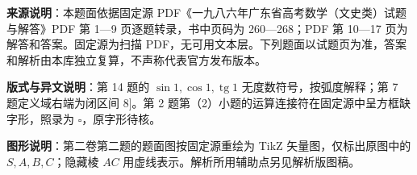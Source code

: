 

\begin{gktip}
\textbf{来源说明}：本题面依据固定源 PDF《一九八六年广东省高考数学（文史类）试题与解答》PDF 第 1—9 页逐题转录，书中页码为 260—268；PDF 第 10—17 页为解答和答案。固定源为扫描 PDF，无可用文本层。下列题面以试题页为准，答案和解析由本库独立复算，不声称代表官方发布版本。

\textbf{版式与异文说明}：第 14 题的 $\sin1,\cos1,\operatorname{tg}1$ 无度数符号，按弧度解释；第 7 题定义域右端为闭区间 $8]$。第 2 题第（2）小题的运算连接符在固定源中呈方框缺字形，照录为 $\square$，原字形待核。

\textbf{图形说明}：第二卷第二题的题面图按固定源重绘为 TikZ 矢量图，仅标出原图中的 $S,A,B,C$；隐藏棱 $AC$ 用虚线表示。解析所用辅助点另见解析版图稿。
\end{gktip}

